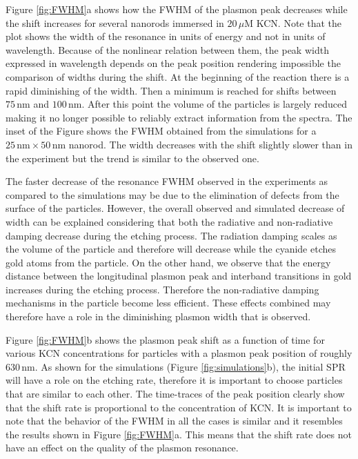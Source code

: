 \documentclass[a4paper,oneside,onecolumn]{article}
\newcommand{\nm}{\ensuremath{\,\textrm{nm}}}
\newcommand{\uM}{\ensuremath{\,\mu\textrm{M}}}
\begin{document}
Figure \ref{fig:FWHM}a shows how the FWHM of the plasmon peak decreases while the shift increases for several nanorods immersed in $20\uM$ KCN. Note that the plot shows the width of the resonance in units of energy and not in units of wavelength. Because of the nonlinear relation between them, the peak width expressed in wavelength depends on the peak position rendering impossible the comparison of widths during the shift. At the beginning of the reaction there is a rapid diminishing of the width. Then a minimum is reached for shifts between $75\nm$ and $100\nm$. After this point the volume of the particles is largely reduced making it no longer possible to reliably extract information from the spectra. The inset of the Figure shows the FWHM obtained from the simulations for a $25\nm\times50\nm$ nanorod. The width decreases with the shift slightly slower than in the experiment but the trend is similar to the observed one.

The faster decrease of the resonance FWHM observed in the experiments as
compared to the simulations may be due to the elimination of defects from the
surface of the particles. However, the overall observed and simulated decrease
of width can be explained considering that both the radiative and non-radiative
damping decrease during the etching process. The radiation damping scales as the
volume of the particle\cite{Wokaun1982} and therefore will decrease while the
cyanide etches gold atoms from the particle.
On the other hand, we observe that the energy distance between the longitudinal
plasmon peak and interband transitions in gold increases during the etching
process. Therefore the non-radiative damping mechanisms in the particle become
less efficient\cite{Sonnichsen2002}. These effects combined may therefore have a
role in the diminishing plasmon width that is observed.

Figure \ref{fig:FWHM}b shows the plasmon peak shift as a function of time for
various KCN concentrations for particles with a plasmon peak position of
roughly $630\nm$. As shown for the simulations (Figure
\ref{fig:simulations}b), the initial SPR will have a role on the etching rate,
therefore it is important to choose particles that are similar to each other.
The time-traces of the peak position clearly show that the shift rate is
proportional to the concentration of KCN. It is important to note that the
behavior of the FWHM in all the cases is similar and it resembles the results
shown in Figure \ref{fig:FWHM}a. This means that the shift rate does not have an
effect on the quality of the plasmon resonance.
\end{document}
